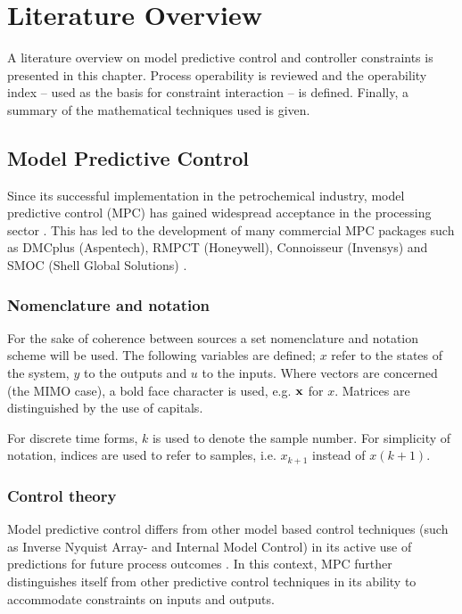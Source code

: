 \chapter{Literature Overview}\label{chap:lit}
\begin{overview}
  A literature overview on model predictive control and controller constraints   is presented in this chapter.
Process operability is reviewed and the   operability index -- used as the basis for constraint interaction -- is   defined.  
Finally, a summary of the mathematical techniques used is given.
\end{overview}

\section{Model Predictive Control}\label{sec:mpclit}
Since its successful implementation in the petrochemical industry, model predictive control (MPC) has gained widespread acceptance in the processing sector \citep[1]{maciejowskimpc}. 
This has led to the development of many commercial MPC packages such as DMCplus (Aspentech), RMPCT (Honeywell), Connoisseur (Invensys) and SMOC (Shell Global Solutions) \citep{qinbadgwell}.
\subsection{Nomenclature and notation}
For the sake of coherence between sources a set nomenclature and notation scheme will be used. 
The following variables are defined; $x$ refer to the states of the system, $y$ to the outputs and $u$ to the inputs.
Where vectors are concerned (the MIMO case), a bold face character is used, e.g. ${\bf {x}}$ for $x$.
Matrices are distinguished by the use of capitals.

For discrete time forms, $k$ is used to denote the sample number.
For simplicity of notation, indices are used to refer to samples, i.e. $x_{k+1}$ instead of $x(k+1)$.
\subsection{Control theory}
Model predictive control differs from other model based control techniques (such  as Inverse Nyquist Array- and Internal Model Control) in its active use of predictions for future process outcomes \citep[137]{maciejowskifb}. 
In this context, MPC further distinguishes itself from other predictive control techniques in its ability to accommodate constraints on inputs and outputs.

